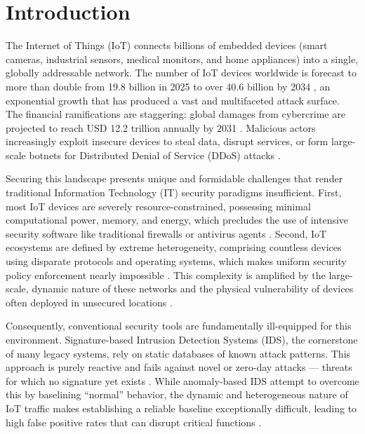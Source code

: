 \chapter{Introduction}\label{cap:intro}

The Internet of Things (IoT) connects billions of embedded devices (smart cameras, industrial sensors, medical monitors, and home appliances) into a single, globally addressable network. The number of IoT devices worldwide is forecast to more than double from 19.8 billion in 2025 to over 40.6 billion by 2034 \cite{Statista2025}, an exponential growth that has produced a vast and multifaceted attack surface. The financial ramifications are staggering: global damages from cybercrime are projected to reach USD 12.2 trillion annually by 2031 \cite{Morgan2025}. Malicious actors increasingly exploit insecure devices to steal data, disrupt services, or form large-scale botnets for Distributed Denial of Service (DDoS) attacks \cite{Neto2023,Tawalbeh2020}.

Securing this landscape presents unique and formidable challenges that render traditional Information Technology (IT) security paradigms insufficient. First, most IoT devices are severely resource-constrained, possessing minimal computational power, memory, and energy, which precludes the use of intensive security software like traditional firewalls or antivirus agents \cite{Chen2021}. Second, IoT ecosystems are defined by extreme heterogeneity, comprising countless devices using disparate protocols and operating systems, which makes uniform security policy enforcement nearly impossible \cite{AlGaradi2020}. This complexity is amplified by the large-scale, dynamic nature of these networks and the physical vulnerability of devices often deployed in unsecured locations \cite{AlGaradi2020}.

Consequently, conventional security tools are fundamentally ill-equipped for this environment. Signature-based Intrusion Detection Systems (IDS), the cornerstone of many legacy systems, rely on static databases of known attack patterns. This approach is purely reactive and fails against novel or zero-day attacks --- threats for which no signature yet exists \cite{Khraisat2019,Yang2024}. While anomaly-based IDS attempt to overcome this by baselining ``normal'' behavior, the dynamic and heterogeneous nature of IoT traffic makes establishing a reliable baseline exceptionally difficult, leading to high false positive rates that can disrupt critical functions \cite{DeMedeiros2023,Tharewal2022}.

